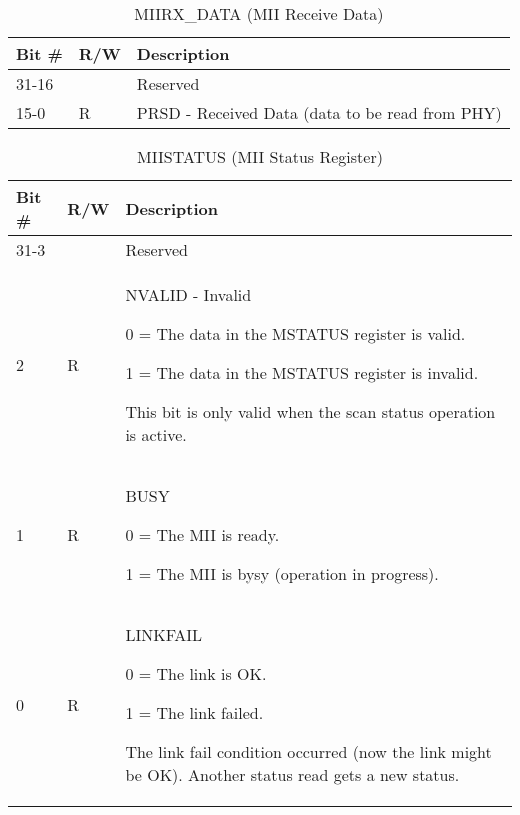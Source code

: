 \begin{table}[H]
  \centering
  \begin{tabularx}{\textwidth}{|l|l|X|}
    
    \hline
    \rowcolor{iob-green}
    {\bf Bit \#} & {\bf R/W} & {\bf Description} \\ \hline

    31-16   &   & Reserved \\ \hline
    \rowcolor{iob-blue}
    15-0    & R &  PRSD - Received Data (data to be read from PHY) \\ \hline
  \end{tabularx}
    \caption{MIIRX\_DATA (MII Receive Data)}
  \label{swreg_details:miirx_data}
\end{table}

\begin{table}[H]
  \centering
  \begin{tabularx}{\textwidth}{|l|l|X|}
    
    \hline
    \rowcolor{iob-green}
    {\bf Bit \#} & {\bf R/W} & {\bf Description} \\ \hline

    31-3   &   & Reserved \\ \hline
    \rowcolor{iob-blue}
    2      & R & NVALID - Invalid

                0 = The data in the MSTATUS register is valid.

                1 = The data in the MSTATUS register is invalid. 

                This bit is only valid when the scan status operation is
                active.\\ \hline
    1      & R & BUSY

                0 = The MII is ready.

                1 = The MII is bysy (operation in progress). \\ \hline
    \rowcolor{iob-blue}
    0      & R & LINKFAIL

                0 = The link is OK.

                1 = The link failed. 

                The link fail condition occurred (now the link might be OK).
                Another status read gets a new status.\\ \hline
  \end{tabularx}
    \caption{MIISTATUS (MII Status Register)}
  \label{swreg_details:miistatus}
\end{table}

